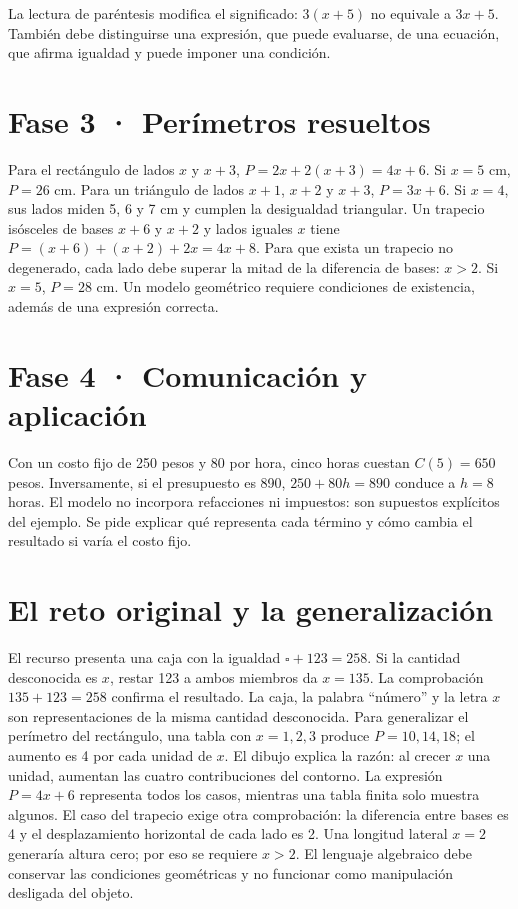 \documentclass[spanish,letterpaper,oneside]{article}
\begin{document}
La lectura de paréntesis modifica el significado: $3(x+5)$ no equivale a $3x+5$. También debe distinguirse una expresión, que puede evaluarse, de una ecuación, que afirma igualdad y puede imponer una condición.
\section{Fase 3 · Perímetros resueltos}
Para el rectángulo de lados $x$ y $x+3$, $P=2x+2(x+3)=4x+6$. Si $x=5$ cm, $P=26$ cm. Para un triángulo de lados $x+1$, $x+2$ y $x+3$, $P=3x+6$. Si $x=4$, sus lados miden 5, 6 y 7 cm y cumplen la desigualdad triangular.
Un trapecio isósceles de bases $x+6$ y $x+2$ y lados iguales $x$ tiene $P=(x+6)+(x+2)+2x=4x+8$. Para que exista un trapecio no degenerado, cada lado debe superar la mitad de la diferencia de bases: $x>2$. Si $x=5$, $P=28$ cm. Un modelo geométrico requiere condiciones de existencia, además de una expresión correcta.
\begin{center}\end{center}
\section{Fase 4 · Comunicación y aplicación}
Con un costo fijo de 250 pesos y 80 por hora, cinco horas cuestan $C(5)=650$ pesos. Inversamente, si el presupuesto es 890, $250+80h=890$ conduce a $h=8$ horas. El modelo no incorpora refacciones ni impuestos: son supuestos explícitos del ejemplo. Se pide explicar qué representa cada término y cómo cambia el resultado si varía el costo fijo.
\section{El reto original y la generalización}
El recurso presenta una caja con la igualdad $\square+123=258$. Si la cantidad desconocida es $x$, restar 123 a ambos miembros da $x=135$. La comprobación $135+123=258$ confirma el resultado. La caja, la palabra ``número'' y la letra $x$ son representaciones de la misma cantidad desconocida.
Para generalizar el perímetro del rectángulo, una tabla con $x=1,2,3$ produce $P=10,14,18$; el aumento es 4 por cada unidad de $x$. El dibujo explica la razón: al crecer $x$ una unidad, aumentan las cuatro contribuciones del contorno. La expresión $P=4x+6$ representa todos los casos, mientras una tabla finita solo muestra algunos.
El caso del trapecio exige otra comprobación: la diferencia entre bases es 4 y el desplazamiento horizontal de cada lado es 2. Una longitud lateral $x=2$ generaría altura cero; por eso se requiere $x>2$. El lenguaje algebraico debe conservar las condiciones geométricas y no funcionar como manipulación desligada del objeto.
\end{document}
